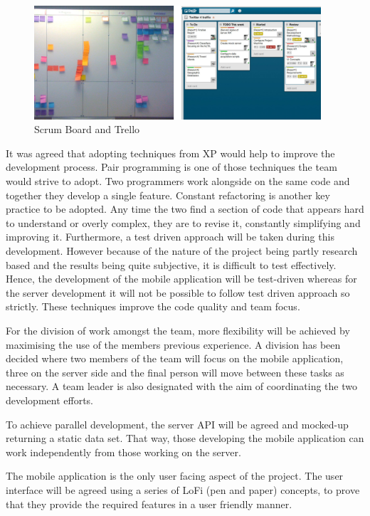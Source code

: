 \begin{figure}[here]
\begin{minipage}{\textwidth}  
\begin{center}
\includegraphics[width=0.95\textwidth]{images/scrumboard.jpg}
\end{center}
\vspace{-20pt}
\caption[Caption for LOF]{Scrum Board and Trello\footnotemark}
\end{minipage} 
\end{figure}

It was agreed that adopting techniques from XP would help to
improve the development process. Pair programming is one of those techniques the team would strive to adopt.
Two programmers work alongside on the same code and together they develop a single feature. Constant refactoring is another key practice to be adopted. Any
time the two find a section of code that appears hard to understand or overly
complex, they are to revise it, constantly simplifying and improving it. Furthermore, a test driven approach will be taken during this development.
However because of the nature of the project being partly research based and
the results being quite subjective, it is difficult to test effectively. Hence,
the development of the mobile application will be test-driven whereas for the
server development it will not be possible to follow test driven approach so strictly\cite{Cockburn}. These techniques improve the code quality and team focus.

For the division of work amongst the team, more flexibility will be achieved by maximising the use of the members previous experience. A division has been decided where two members of the team will focus on the mobile application, three on the server side and the final person will move between these tasks as necessary. A team leader is also designated with the aim of coordinating the two development efforts.  

To achieve parallel development, the server API will be agreed and mocked-up returning a static data set. That way, those developing the mobile application can work independently from those working on the server.

The mobile application is the only user facing aspect of the project. The user interface will be agreed using a series of LoFi (pen and paper) concepts, to prove that they provide the required features in a user friendly manner.

